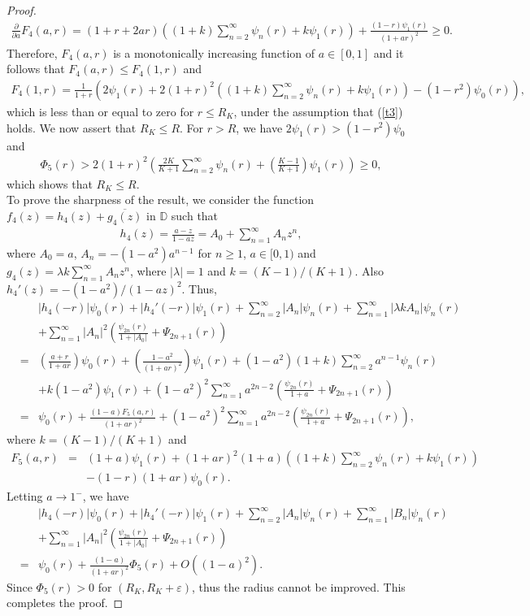 \documentclass[11pt,reqno]{amsart}
\newtheorem{open problem}{Open problem}[section]
\newcommand{\pa}{\partial}
\newcommand{\ol}{\overline}
\newcommand{\beas}{\begin{eqnarray*}}
\newcommand{\eeas}{\end{eqnarray*}}
\renewcommand{\epsilon}{\varepsilon}
\numberwithin{equation}{section}
\begin{document}
\begin{proof}
\beas\frac{\pa}{\pa a}F_4(a,r)=\left(1+r+2ar\right)\left((1+k)\sum_{n=2}^\infty \psi_n(r)+k\psi_1(r)\right)+\frac{(1-r)\psi_1(r)}{(1+ar)^2}\geq 0.\eeas
Therefore, $F_4(a,r)$ is a monotonically increasing function of $a\in[0, 1]$ and it follows that $F_4(a,r)\leq F_4(1,r)$ and
\beas F_4(1,r)=\frac{1}{1+r}\left(2\psi_1(r)+2(1+r)^2\left((1+k)\sum_{n=2}^\infty \psi_n(r)+k\psi_1(r)\right)-\left(1-r^2\right)\psi_0(r)\right),\eeas
which is less than or equal to zero for $r\leq R_K$, under the assumption that (\ref{t3}) holds. We now assert that $R_K\leq R$. For $r>R$, we have $2\psi_1(r)>\left(1-r^2\right)\psi_0$ and
\beas\Phi_5(r)>2(1+r)^2\left(\frac{2K}{K+1}\sum_{n=2}^\infty \psi_n(r)+\left(\frac{K-1}{K+1}\right)\psi_1(r)\right)\geq0,\eeas
which shows that $R_K\leq R$.\\[2mm]
\indent To prove the sharpness of the result, we consider the function $f_4(z)=h_4(z)+\ol{g_4(z)}$ in $\mathbb{D}$ such that 
\beas h_4(z)=\frac{a-z}{1-az}=A_0+\sum_{n=1}^\infty A_n z^n,\eeas
where $A_0=a$, $A_n=-(1-a^2)a^{n-1}$ for $n\geq 1$, $a\in[0,1)$ and $g_4(z)=\lambda k \sum_{n=1}^\infty A_n z^n$, where $|\lambda|=1$ and $k=(K-1)/(K+1)$.
Also $h_4'(z)=-\left(1-a^2\right)/(1-az)^2$.
Thus, 
\beas &&|h_4(-r)|\psi_0(r)+|h_4'(-r)|\psi_1(r)+\sum_{n=2}^\infty |A_n| \psi_n(r)+\sum_{n=1}^\infty |\lambda k A_n| \psi_n(r)\\[2mm]
&&+\sum_{n=1}^\infty |A_n|^2\left(\frac{\psi_{2n}(r)}{1+|A_0|}+\Psi_{2n+1}(r)\right)\\[2mm]
&=&\left(\frac{a+r}{1+ar}\right)\psi_0(r)+\left(\frac{1-a^2}{(1+ar)^2}\right)\psi_1(r)+\left(1-a^2\right)(1+k)\sum_{n=2}^\infty a^{n-1} \psi_n(r)\\[2mm]
&&+k\left(1-a^2\right)\psi_1(r)+\left(1-a^2\right)^2\sum_{n=1}^\infty a^{2n-2}\left(\frac{\psi_{2n}(r)}{1+a}+\Psi_{2n+1}(r)\right)\\[2mm]
&=&\psi_0(r)+\frac{(1-a)F_5(a,r)}{(1+ar)^2}+\left(1-a^2\right)^2\sum_{n=1}^\infty a^{2n-2}\left(\frac{\psi_{2n}(r)}{1+a}+\Psi_{2n+1}(r)\right),\eeas
where $k=(K-1)/(K+1)$ and 
\beas F_5(a,r)&=&\left(1+a\right)\psi_1(r)+(1+ar)^2\left(1+a\right)\left((1+k)\sum_{n=2}^\infty \psi_n(r)+k\psi_1(r)\right)\\[2mm]
&&-(1-r)(1+ar)\psi_0(r).\eeas
Letting $a\to 1^-$, we have
\beas&&|h_4(-r)|\psi_0(r)+|h_4'(-r)|\psi_1(r)+\sum_{n=2}^\infty |A_n| \psi_n(r)+\sum_{n=1}^\infty |B_n| \psi_n(r)\\[2mm]
&&+\sum_{n=1}^\infty |A_n|^2\left(\frac{\psi_{2n}(r)}{1+|A_0|}+\Psi_{2n+1}(r)\right)\hspace{10cm}\\[2mm]
&=&\psi_0(r)+\frac{(1-a)}{(1+ar)^2}\Phi_5(r)+O\left(\left(1-a\right)^2\right).\eeas 
Since $\Phi_5(r)>0$ for $(R_{K}, R_{K}+\epsilon)$, thus the radius cannot be improved. This completes the proof.
\end{proof}
\end{document}
